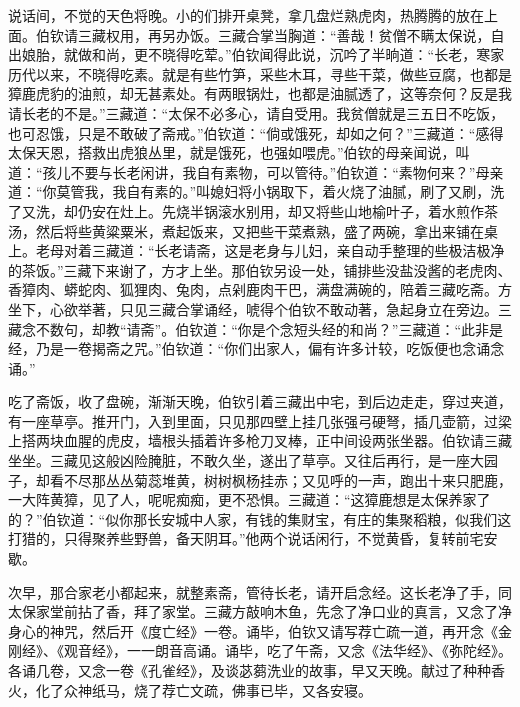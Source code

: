 \documentclass[12pt]{lsbook}
\begin{document}
说话间，不觉的天色将晚。小的们排开桌凳，拿几盘烂熟虎肉，热腾腾的放在上面。伯钦请三藏权用，再另办饭。三藏合掌当胸道：“善哉！贫僧不瞒太保说，自出娘胎，就做和尚，更不晓得吃荤。”伯钦闻得此说，沉吟了半晌道：“长老，寒家历代以来，不晓得吃素。就是有些竹笋，采些木耳，寻些干菜，做些豆腐，也都是獐鹿虎豹的油煎，却无甚素处。有两眼锅灶，也都是油腻透了，这等奈何？反是我请长老的不是。”三藏道：“太保不必多心，请自受用。我贫僧就是三五日不吃饭，也可忍饿，只是不敢破了斋戒。”伯钦道：“倘或饿死，却如之何？”三藏道：“感得太保天恩，搭救出虎狼丛里，就是饿死，也强如喂虎。”伯钦的母亲闻说，叫道：“孩儿不要与长老闲讲，我自有素物，可以管待。”伯钦道：“素物何来？”母亲道：“你莫管我，我自有素的。”叫媳妇将小锅取下，着火烧了油腻，刷了又刷，洗了又洗，却仍安在灶上。先烧半锅滚水别用，却又将些山地榆叶子，着水煎作茶汤，然后将些黄粱粟米，煮起饭来，又把些干菜煮熟，盛了两碗，拿出来铺在桌上。老母对着三藏道：“长老请斋，这是老身与儿妇，亲自动手整理的些极洁极净的茶饭。”三藏下来谢了，方才上坐。那伯钦另设一处，铺排些没盐没酱的老虎肉、香獐肉、蟒蛇肉、狐狸肉、兔肉，点剁鹿肉干巴，满盘满碗的，陪着三藏吃斋。方坐下，心欲举著，只见三藏合掌诵经，唬得个伯钦不敢动著，急起身立在旁边。三藏念不数句，却教“请斋”。伯钦道：“你是个念短头经的和尚？”三藏道：“此非是经，乃是一卷揭斋之咒。”伯钦道：“你们出家人，偏有许多计较，吃饭便也念诵念诵。”

吃了斋饭，收了盘碗，渐渐天晚，伯钦引着三藏出中宅，到后边走走，穿过夹道，有一座草亭。推开门，入到里面，只见那四壁上挂几张强弓硬弩，插几壶箭，过梁上搭两块血腥的虎皮，墙根头插着许多枪刀叉棒，正中间设两张坐器。伯钦请三藏坐坐。三藏见这般凶险腌脏，不敢久坐，遂出了草亭。又往后再行，是一座大园子，却看不尽那丛丛菊蕊堆黄，树树枫杨挂赤；又见呼的一声，跑出十来只肥鹿，一大阵黄獐，见了人，呢呢痴痴，更不恐惧。三藏道：“这獐鹿想是太保养家了的？”伯钦道：“似你那长安城中人家，有钱的集财宝，有庄的集聚稻粮，似我们这打猎的，只得聚养些野兽，备天阴耳。”他两个说话闲行，不觉黄昏，复转前宅安歇。

次早，那合家老小都起来，就整素斋，管待长老，请开启念经。这长老净了手，同太保家堂前拈了香，拜了家堂。三藏方敲响木鱼，先念了净口业的真言，又念了净身心的神咒，然后开《度亡经》一卷。诵毕，伯钦又请写荐亡疏一道，再开念《金刚经》、《观音经》，一一朗音高诵。诵毕，吃了午斋，又念《法华经》、《弥陀经》。各诵几卷，又念一卷《孔雀经》，及谈苾蒭洗业的故事，早又天晚。献过了种种香火，化了众神纸马，烧了荐亡文疏，佛事已毕，又各安寝。
\end{document}

